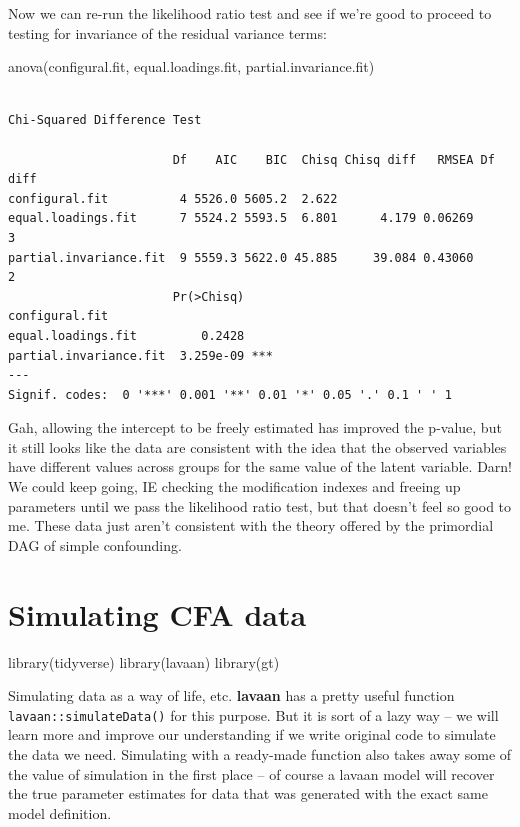 \documentclass[
  letterpaper,
  DIV=11,
  numbers=noendperiod]{scrreprt}
\newenvironment{Shaded}{\begin{snugshade}}{\end{snugshade}}
\newcommand{\FunctionTok}[1]{\textcolor[rgb]{0.28,0.35,0.67}{#1}}
\newcommand{\NormalTok}[1]{\textcolor[rgb]{0.00,0.23,0.31}{#1}}
\begin{document}
Now we can re-run the likelihood ratio test and see if we're good to
proceed to testing for invariance of the residual variance terms:

\begin{Shaded}
\begin{Highlighting}[]
\FunctionTok{anova}\NormalTok{(configural.fit, equal.loadings.fit, partial.invariance.fit)}
\end{Highlighting}
\end{Shaded}

\begin{verbatim}

Chi-Squared Difference Test

                       Df    AIC    BIC  Chisq Chisq diff   RMSEA Df diff
configural.fit          4 5526.0 5605.2  2.622                           
equal.loadings.fit      7 5524.2 5593.5  6.801      4.179 0.06269       3
partial.invariance.fit  9 5559.3 5622.0 45.885     39.084 0.43060       2
                       Pr(>Chisq)    
configural.fit                       
equal.loadings.fit         0.2428    
partial.invariance.fit  3.259e-09 ***
---
Signif. codes:  0 '***' 0.001 '**' 0.01 '*' 0.05 '.' 0.1 ' ' 1
\end{verbatim}

Gah, allowing the intercept to be freely estimated has improved the
p-value, but it still looks like the data are consistent with the idea
that the observed variables have different values across groups for the
same value of the latent variable. Darn! We could keep going, IE
checking the modification indexes and freeing up parameters until we
pass the likelihood ratio test, but that doesn't feel so good to me.
These data just aren't consistent with the theory offered by the
primordial DAG of simple confounding.

\hypertarget{simulating-cfa-data}{%
\chapter{Simulating CFA data}\label{simulating-cfa-data}}

\begin{Shaded}
\begin{Highlighting}[]
\FunctionTok{library}\NormalTok{(tidyverse)}
\FunctionTok{library}\NormalTok{(lavaan)}
\FunctionTok{library}\NormalTok{(gt)}
\end{Highlighting}
\end{Shaded}

Simulating data as a way of life, etc. \textbf{lavaan} has a pretty
useful function \texttt{lavaan::simulateData()} for this purpose. But it
is sort of a lazy way -- we will learn more and improve our
understanding if we write original code to simulate the data we need.
Simulating with a ready-made function also takes away some of the value
of simulation in the first place -- of course a lavaan model will
recover the true parameter estimates for data that was generated with
the exact same model definition.
\end{document}

